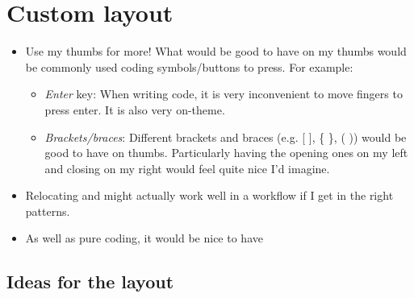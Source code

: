 \documentclass[11pt,a4paper]{article}
\numberwithin{equation}{section}
\begin{document}
\section{Custom layout}

\begin{itemize}
    \item Use my thumbs for more! What would be good to have on my thumbs would be commonly used coding symbols/buttons to press. For example:
    \begin{itemize}
        \item \textit{Enter} key: When writing code, it is very inconvenient to move fingers to press enter. It is also very on-theme.
        \item \textit{Brackets/braces}: Different brackets and braces (e.g. [ ], \{ \}, ( )) would be good to have on thumbs. Particularly having the opening ones on my left and closing on my right would feel quite nice I'd imagine.
    \end{itemize}
    \item Relocating  and  might actually work well in a workflow if I get in the right patterns.
    \item As well as pure coding, it would be nice to have 
\end{itemize}

\subsection{Ideas for the layout}
\end{document}

